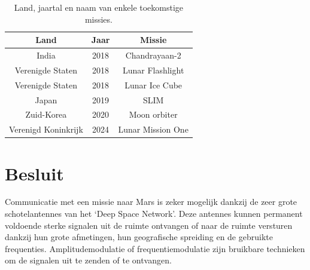 \begin{table}[ht]
\centering
\small
\begin{tabular}{cc|c} %
Land &Jaar &Missie \\ \hline
India &2018 &Chandrayaan-2 \\
Verenigde Staten &2018 &Lunar Flashlight \\
Verenigde Staten &2018 &Lunar Ice Cube \\
Japan &2019 &SLIM \\
Zuid-Korea &2020 &Moon orbiter \\
Verenigd Koninkrijk &2024 &Lunar Mission One \\
\end{tabular}
\caption{Land, jaartal en naam van enkele toekomstige missies.}
\cite{missies}
\label{tab:missies}
\end{table}

\section{Besluit}

Communicatie met een missie naar Mars is zeker mogelijk dankzij de zeer grote schotelantennes van het ‘Deep Space Network’. Deze antennes kunnen permanent voldoende sterke signalen uit de ruimte ontvangen of naar de ruimte versturen dankzij hun grote afmetingen, hun geografische spreiding en de gebruikte frequenties. Amplitudemodulatie of frequentiemodulatie zijn bruikbare technieken om de signalen uit te zenden of te ontvangen.